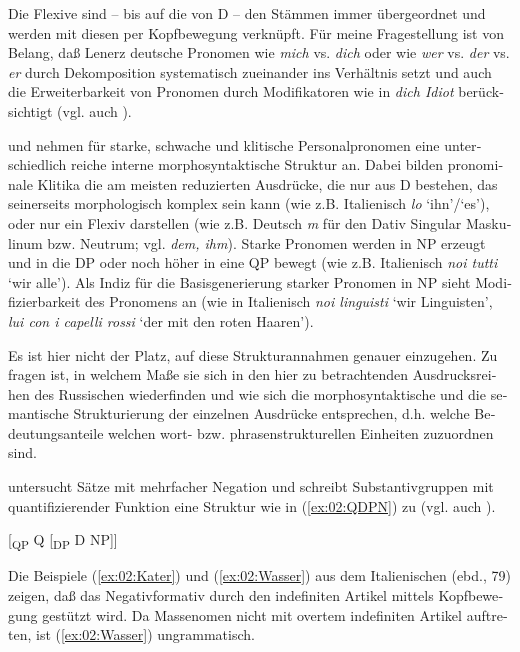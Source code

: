 \documentclass[output=paper, colorlinks, citecolor=brown, booklanguage=german]{langscibook}
\begin{document}
\begin{otherlanguage}{german}
\noindent Die Flexive sind -- bis auf die von D -- den Stämmen immer übergeordnet und werden mit diesen per Kopfbewegung verknüpft. Für meine Fragestellung ist von Belang, daß Lenerz deutsche Pronomen wie \textit{mich} vs. \textit{dich} oder wie \textit{wer} vs. \textit{der} vs. \textit{er} durch Dekomposition systematisch zueinander ins Verhältnis setzt und auch die Erweiterbarkeit von Pronomen durch Modifikatoren wie in \textit{dich Idiot} berücksichtigt (vgl. auch \citealt{Zwarts1992}).

\citet{Cardinaletti1994} und \citet{Cardinaletti.Starke1995} nehmen für starke, schwache und klitische Personalpronomen eine unterschiedlich reiche interne morphosyntaktische Struktur an. Dabei bilden pronominale Klitika die am mei\-sten reduzier\-ten Ausdrücke, die nur aus D bestehen, das seinerseits morphologisch komplex sein kann (wie z.B. Italienisch \textit{lo} `ihn'/`es'), oder nur ein Flexiv darstellen (wie z.B. Deutsch \textit{m} für den Dativ Singular Maskulinum bzw. Neutrum; vgl. \textit{dem, ihm}). Starke Pronomen werden in NP erzeugt und in die DP oder noch höher in eine QP bewegt (wie z.B. Italienisch \textit{noi tutti} `wir alle'). Als Indiz für die Basisgenerierung starker Pronomen in NP sieht \citet{Cardinaletti1994} Mo\-di\-fi\-zier\-bar\-keit des Pronomens an (wie in Italienisch \textit{noi linguisti} `wir Linguisten', \textit{lui con i capelli rossi} `der mit den roten Haaren').

Es ist hier nicht der Platz, auf diese Strukturannahmen genauer einzugehen. Zu fragen ist, in welchem Maße sie sich in den hier zu betrachtenden Ausdrucksreihen des Russischen wiederfinden und wie sich die morphosyntaktische und die semantische Strukturierung der einzelnen Ausdrücke entsprechen, d.h. welche Bedeutungsanteile welchen wort- bzw. phrasenstrukturellen Einheiten zuzuordnen sind.

\citet{Acquaviva1995} untersucht Sätze mit mehrfacher Negation und schreibt Substantivgruppen mit quantifizierender Funktion eine Struktur wie in (\ref{ex:02:QDPN}) zu (vgl. auch \citealt{Giusti1991}).

\ea\label{ex:02:QDPN}
    [\textsubscript{QP} Q [\textsubscript{DP} D NP]]
\z 

\noindent Die Beispiele (\ref{ex:02:Kater}) und (\ref{ex:02:Wasser}) aus dem Italienischen (ebd., 79) zeigen, daß das Negativformativ durch den indefiniten Artikel mittels Kopfbewegung gestützt wird. Da Massenomen nicht mit overtem indefiniten Artikel auftreten, ist (\ref{ex:02:Wasser}) ungrammatisch.


\end{otherlanguage}
\end{document}
